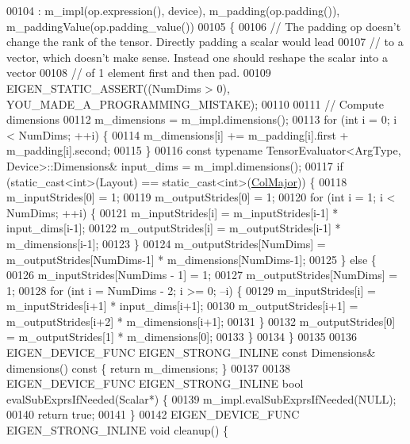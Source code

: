 \begin{DoxyCode}
00104       : m\_impl(op.expression(), device), m\_padding(op.padding()), m\_paddingValue(op.padding\_value())
00105   \{
00106     \textcolor{comment}{// The padding op doesn't change the rank of the tensor. Directly padding a scalar would lead}
00107     \textcolor{comment}{// to a vector, which doesn't make sense. Instead one should reshape the scalar into a vector}
00108     \textcolor{comment}{// of 1 element first and then pad.}
00109     EIGEN\_STATIC\_ASSERT((NumDims > 0), YOU\_MADE\_A\_PROGRAMMING\_MISTAKE);
00110 
00111     \textcolor{comment}{// Compute dimensions}
00112     m\_dimensions = m\_impl.dimensions();
00113     \textcolor{keywordflow}{for} (\textcolor{keywordtype}{int} i = 0; i < NumDims; ++i) \{
00114       m\_dimensions[i] += m\_padding[i].first + m\_padding[i].second;
00115     \}
00116     \textcolor{keyword}{const} \textcolor{keyword}{typename} TensorEvaluator<ArgType, Device>::Dimensions& input\_dims = m\_impl.dimensions();
00117     \textcolor{keywordflow}{if} (static\_cast<int>(Layout) == static\_cast<int>(\hyperlink{group__enums_ggaacded1a18ae58b0f554751f6cdf9eb13a0cbd4bdd0abcfc0224c5fcb5e4f6669a}{ColMajor})) \{
00118       m\_inputStrides[0] = 1;
00119       m\_outputStrides[0] = 1;
00120       \textcolor{keywordflow}{for} (\textcolor{keywordtype}{int} i = 1; i < NumDims; ++i) \{
00121         m\_inputStrides[i] = m\_inputStrides[i-1] * input\_dims[i-1];
00122         m\_outputStrides[i] = m\_outputStrides[i-1] * m\_dimensions[i-1];
00123       \}
00124       m\_outputStrides[NumDims] = m\_outputStrides[NumDims-1] * m\_dimensions[NumDims-1];
00125     \} \textcolor{keywordflow}{else} \{
00126       m\_inputStrides[NumDims - 1] = 1;
00127       m\_outputStrides[NumDims] = 1;
00128       \textcolor{keywordflow}{for} (\textcolor{keywordtype}{int} i = NumDims - 2; i >= 0; --i) \{
00129         m\_inputStrides[i] = m\_inputStrides[i+1] * input\_dims[i+1];
00130         m\_outputStrides[i+1] = m\_outputStrides[i+2] * m\_dimensions[i+1];
00131       \}
00132       m\_outputStrides[0] = m\_outputStrides[1] * m\_dimensions[0];
00133     \}
00134   \}
00135 
00136   EIGEN\_DEVICE\_FUNC EIGEN\_STRONG\_INLINE \textcolor{keyword}{const} Dimensions& dimensions()\textcolor{keyword}{ const }\{ \textcolor{keywordflow}{return} m\_dimensions; \}
00137 
00138   EIGEN\_DEVICE\_FUNC EIGEN\_STRONG\_INLINE \textcolor{keywordtype}{bool} evalSubExprsIfNeeded(Scalar*) \{
00139     m\_impl.evalSubExprsIfNeeded(NULL);
00140     \textcolor{keywordflow}{return} \textcolor{keyword}{true};
00141   \}
00142   EIGEN\_DEVICE\_FUNC EIGEN\_STRONG\_INLINE \textcolor{keywordtype}{void} cleanup() \{

\end{DoxyCode}
